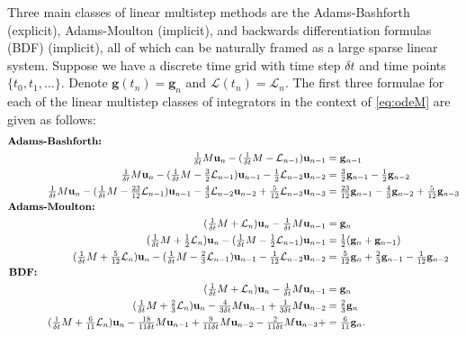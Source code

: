 \documentclass[a4paper,12pt]{article}
\begin{document}
Three main classes of linear multistep methods are the Adams-Bashforth (explicit), Adams-Moulton (implicit), and backwards
differentiation formulas (BDF) (implicit), all of which can be naturally framed as a large sparse linear system. Suppose we have a
discrete time grid with time step $\delta t$ and time points $\{t_0,t_1,...\}$. Denote $\mathbf{g}(t_n) = \mathbf{g}_n$ and
$\mathcal{L}(t_n) = \mathcal{L}_n$. The first three formulae for each of the linear multistep classes of integrators in the context
of \eqref{eq:odeM} are given as follows:
%
{\footnotesize
\begin{align*}
%
\textnormal{\textbf{Adams-Bashforth:}}\hspace{50.5ex}&\\
\tfrac{1}{\delta t}M\mathbf{u}_n - (\tfrac{1}{\delta t}M - \mathcal{L}_{n-1})\mathbf{u}_{n-1} & =\mathbf{g}_{n-1}  \\
\tfrac{1}{\delta t}M\mathbf{u}_n - (\tfrac{1}{\delta t}M - \tfrac{3}{2}\mathcal{L}_{n-1})\mathbf{u}_{n-1} -
	\tfrac{1}{2}\mathcal{L}_{n-2}\mathbf{u}_{n-2} & = \tfrac{3}{2}\mathbf{g}_{n-1} - \tfrac{1}{2}\mathbf{g}_{n-2}\\
\tfrac{1}{\delta t}M\mathbf{u}_n - (\tfrac{1}{\delta t}M - \tfrac{23}{12}\mathcal{L}_{n-1})\mathbf{u}_{n-1} -
	\tfrac{4}{3}\mathcal{L}_{n-2}\mathbf{u}_{n-2} + \tfrac{5}{12}\mathcal{L}_{n-3}\mathbf{u}_{n-3} & = \tfrac{23}{12}\mathbf{g}_{n-1} -
	\tfrac{4}{3}\mathbf{g}_{n-2} + \tfrac{5}{12}\mathbf{g}_{n-3}\\
%
\textnormal{\textbf{Adams-Moulton:}}\hspace{52ex}&\\
(\tfrac{1}{\delta t}M +  \mathcal{L}_n)\mathbf{u}_n - \tfrac{1}{\delta t}M\mathbf{u}_{n-1} &  =   \mathbf{g}_n \\
(\tfrac{1}{\delta t}M + \tfrac{1}{2} \mathcal{L}_n)\mathbf{u}_n - (\tfrac{1}{\delta t}M - \tfrac{1}{2} \mathcal{L}_{n-1})\mathbf{u}_{n-1} & =
	\tfrac{1}{2}  (\mathbf{g}_n + \mathbf{g}_{n-1}) \\
(\tfrac{1}{\delta t}M + \tfrac{5}{12} \mathcal{L}_n)\mathbf{u}_n - (\tfrac{1}{\delta t}M - \tfrac{2}{3} \mathcal{L}_{n-1})\mathbf{u}_{n-1} - 
	\tfrac{1}{12}\mathcal{L}_{n-2}\mathbf{u}_{n-2}& = \tfrac{5}{12} \mathbf{g}_n + \tfrac{2}{3} \mathbf{g}_{n-1} -
	\tfrac{1}{12} \mathbf{g}_{n-2}\\
%
\textnormal{\textbf{BDF:}}\hspace{65ex}&\\
(\tfrac{1}{\delta t}M + \mathcal{L}_n)\mathbf{u}_n - \tfrac{1}{\delta t}M\mathbf{u}_{n-1} &  =   \mathbf{g}_n \\
(\tfrac{1}{\delta t}M + \tfrac{2}{3} \mathcal{L}_n)\mathbf{u}_{n} - \tfrac{4}{3\delta t}M\mathbf{u}_{n-1} +
 	\tfrac{1}{3\delta t}M\mathbf{u}_{n-2} & = \tfrac{2}{3}\mathbf{g}_n \\
(\tfrac{1}{\delta t}M + \tfrac{6}{11} \mathcal{L}_n)\mathbf{u}_{n} - \tfrac{18}{11\delta t}M\mathbf{u}_{n-1} +
	\tfrac{9}{11\delta t}M\mathbf{u}_{n-2} - \tfrac{2}{11\delta t}M\mathbf{u}_{n-3} +  & =   \tfrac{6}{11}  \mathbf{g}_n.
\end{align*}
}
\end{document}
